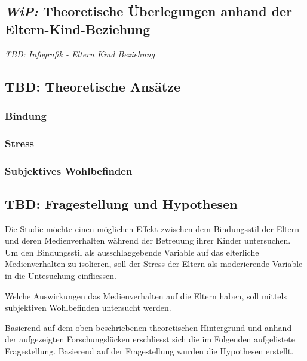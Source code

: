 \subsection{\textit{WiP:} Theoretische Überlegungen anhand der Eltern-Kind-Beziehung} \label{sec:TheretischeÜberlegungen}
\textit{TBD: Infografik - Eltern Kind Beziehung}


\subsection{TBD: Theoretische Ansätze} \label{sec:TheretischeAnsätze}

\subsubsection{Bindung}\label{sec:Bindung}

\subsubsection{Stress}\label{sec:Stress}

\subsubsection{Subjektives Wohlbefinden}\label{sec:Swb}






\subsection{TBD: Fragestellung und Hypothesen} \label{sec:Fragestellung}
Die Studie möchte einen möglichen Effekt zwischen dem Bindungsstil der Eltern und deren Medienverhalten während der Betreuung ihrer Kinder untersuchen. Um den Bindungsstil als ausschlaggebende Variable auf das elterliche Medienverhalten zu isolieren, soll der Stress der Eltern als moderierende Variable in die Untesuchung einfliessen.

Welche Auswirkungen das Medienverhalten auf die Eltern haben, soll mittels subjektiven Wohlbefinden  untersucht werden. 

Basierend auf dem oben beschriebenen theoretischen Hintergrund und anhand der aufgezeigten Forschungslücken erschliesst sich die im Folgenden aufgelistete Fragestellung. Basierend auf der Fragestellung wurden die Hypothesen erstellt.
